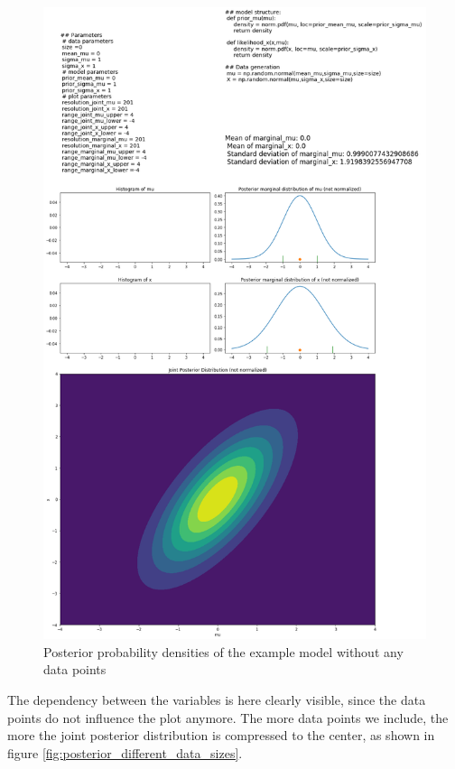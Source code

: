 \documentclass{article}
\begin{document}
\begin{figure}
	\includegraphics[width=\textwidth]{images/ground_truth_posterior_5.png}
	\caption[Posterior probability densities of the example model without any data points]{Posterior probability densities of the example model without any data points}
	\label{fig:ground_truth_posterior_5}
\end{figure}
The dependency between the variables is here clearly visible, since the data points do not influence the plot anymore. The more data points we include, the more the joint posterior distribution is compressed to the center, as shown in figure \ref{fig:posterior_different_data_sizes}.
\end{document}
